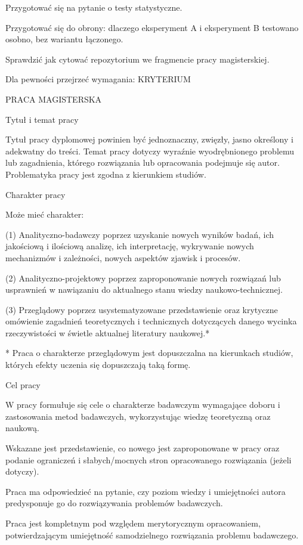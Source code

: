 Przygotować się na pytanie o testy statystyczne.

Przygotować się do obrony: dlaczego eksperyment A i eksperyment B testowano osobno, bez wariantu łączonego.

Sprawdzić jak cytować repozytorium we fragmencie pracy magisterskiej.

Dla pewności przejrzeć wymagania:
KRYTERIUM

PRACA MAGISTERSKA

Tytuł i temat pracy

Tytuł pracy dyplomowej powinien być jednoznaczny, zwięzły, jasno określony i adekwatny do treści. Temat pracy dotyczy wyraźnie wyodrębnionego problemu lub zagadnienia, którego rozwiązania lub opracowania podejmuje się autor. Problematyka pracy jest zgodna z kierunkiem studiów.

Charakter pracy

Może mieć charakter:

(1)   Analityczno-badawczy poprzez uzyskanie nowych wyników badań, ich jakościową i ilościową analizę, ich interpretację, wykrywanie nowych mechanizmów i zależności, nowych aspektów zjawisk i procesów.

(2)   Analityczno-projektowy poprzez zaproponowanie nowych rozwiązań lub usprawnień w nawiązaniu do aktualnego stanu wiedzy naukowo-technicznej.

(3)   Przeglądowy poprzez usystematyzowane przedstawienie oraz krytyczne omówienie zagadnień teoretycznych i technicznych dotyczących danego wycinka rzeczywistości w świetle aktualnej literatury naukowej.*

* Praca o charakterze przeglądowym jest dopuszczalna na kierunkach studiów, których efekty uczenia się dopuszczają taką formę.

Cel pracy

W pracy formułuje się cele o charakterze badawczym wymagające doboru i zastosowania metod badawczych, wykorzystując wiedzę teoretyczną oraz naukową.

Wskazane jest przedstawienie, co nowego jest zaproponowane w pracy oraz podanie ograniczeń i słabych/mocnych stron opracowanego rozwiązania (jeżeli dotyczy).

Praca ma odpowiedzieć na pytanie, czy poziom wiedzy i umiejętności autora predysponuje go do rozwiązywania problemów badawczych.

Praca jest kompletnym pod względem merytorycznym opracowaniem, potwierdzającym umiejętność samodzielnego rozwiązania problemu badawczego.

